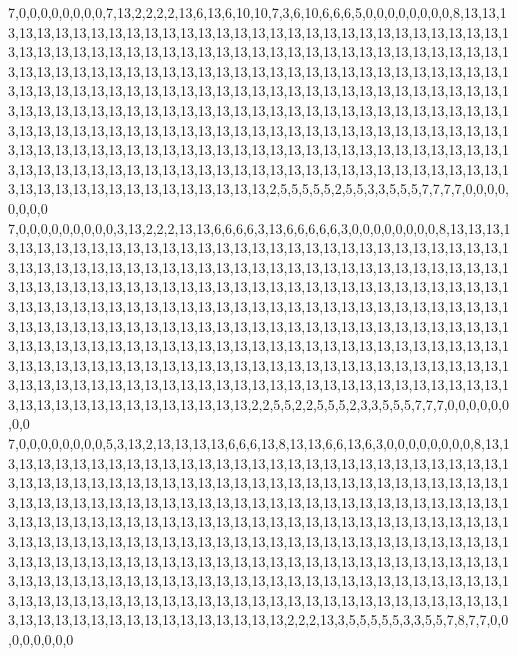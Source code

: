 7,0,0,0,0,0,0,0,0,7,13,2,2,2,2,13,6,13,6,10,10,7,3,6,10,6,6,6,5,0,0,0,0,0,0,0,0,8,13,13,13,13,13,13,13,13,13,13,13,13,13,13,13,13,13,13,13,13,13,13,13,13,13,13,13,13,13,13,13,13,13,13,13,13,13,13,13,13,13,13,13,13,13,13,13,13,13,13,13,13,13,13,13,13,13,13,13,13,13,13,13,13,13,13,13,13,13,13,13,13,13,13,13,13,13,13,13,13,13,13,13,13,13,13,13,13,13,13,13,13,13,13,13,13,13,13,13,13,13,13,13,13,13,13,13,13,13,13,13,13,13,13,13,13,13,13,13,13,13,13,13,13,13,13,13,13,13,13,13,13,13,13,13,13,13,13,13,13,13,13,13,13,13,13,13,13,13,13,13,13,13,13,13,13,13,13,13,13,13,13,13,13,13,13,13,13,13,13,13,13,13,13,13,13,13,13,13,13,13,13,13,13,13,13,13,13,13,13,13,13,13,13,13,13,13,13,13,13,13,13,13,13,13,13,13,13,13,13,13,13,13,13,13,13,13,13,13,13,13,13,13,13,13,13,13,13,13,13,13,13,13,13,13,13,13,13,13,13,13,2,5,5,5,5,5,2,5,5,3,3,5,5,5,7,7,7,7,0,0,0,0,0,0,0,0
7,0,0,0,0,0,0,0,0,0,3,13,2,2,2,13,13,6,6,6,6,3,13,6,6,6,6,6,3,0,0,0,0,0,0,0,0,8,13,13,13,13,13,13,13,13,13,13,13,13,13,13,13,13,13,13,13,13,13,13,13,13,13,13,13,13,13,13,13,13,13,13,13,13,13,13,13,13,13,13,13,13,13,13,13,13,13,13,13,13,13,13,13,13,13,13,13,13,13,13,13,13,13,13,13,13,13,13,13,13,13,13,13,13,13,13,13,13,13,13,13,13,13,13,13,13,13,13,13,13,13,13,13,13,13,13,13,13,13,13,13,13,13,13,13,13,13,13,13,13,13,13,13,13,13,13,13,13,13,13,13,13,13,13,13,13,13,13,13,13,13,13,13,13,13,13,13,13,13,13,13,13,13,13,13,13,13,13,13,13,13,13,13,13,13,13,13,13,13,13,13,13,13,13,13,13,13,13,13,13,13,13,13,13,13,13,13,13,13,13,13,13,13,13,13,13,13,13,13,13,13,13,13,13,13,13,13,13,13,13,13,13,13,13,13,13,13,13,13,13,13,13,13,13,13,13,13,13,13,13,13,13,13,13,13,13,13,13,13,13,13,13,13,13,13,13,13,13,13,2,2,5,5,2,2,5,5,5,2,3,3,5,5,5,7,7,7,0,0,0,0,0,0,0,0
7,0,0,0,0,0,0,0,0,5,3,13,2,13,13,13,13,6,6,6,13,8,13,13,6,6,13,6,3,0,0,0,0,0,0,0,0,8,13,13,13,13,13,13,13,13,13,13,13,13,13,13,13,13,13,13,13,13,13,13,13,13,13,13,13,13,13,13,13,13,13,13,13,13,13,13,13,13,13,13,13,13,13,13,13,13,13,13,13,13,13,13,13,13,13,13,13,13,13,13,13,13,13,13,13,13,13,13,13,13,13,13,13,13,13,13,13,13,13,13,13,13,13,13,13,13,13,13,13,13,13,13,13,13,13,13,13,13,13,13,13,13,13,13,13,13,13,13,13,13,13,13,13,13,13,13,13,13,13,13,13,13,13,13,13,13,13,13,13,13,13,13,13,13,13,13,13,13,13,13,13,13,13,13,13,13,13,13,13,13,13,13,13,13,13,13,13,13,13,13,13,13,13,13,13,13,13,13,13,13,13,13,13,13,13,13,13,13,13,13,13,13,13,13,13,13,13,13,13,13,13,13,13,13,13,13,13,13,13,13,13,13,13,13,13,13,13,13,13,13,13,13,13,13,13,13,13,13,13,13,13,13,13,13,13,13,13,13,13,13,13,13,13,13,13,13,13,13,13,2,2,2,13,3,5,5,5,5,5,3,3,5,5,7,8,7,7,0,0,0,0,0,0,0,0
